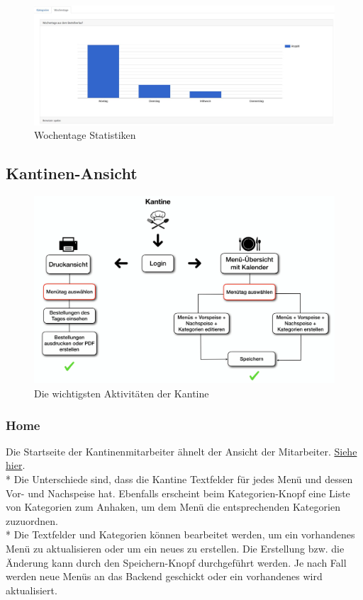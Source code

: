 \begin{figure}[htp]
    \centering
    \includegraphics[scale=0.3]{pics/statistiken_wochentage.JPG}
    \caption{Wochentage Statistiken}
    \label{fig:impl:WeekDaysCategories}
\end{figure}

\pagebreak

\subsection {Kantinen-Ansicht}
\begin{figure}[htp]
    \centering
    \includegraphics[scale=0.125]{pics/activity-kantine.png}
    \caption{Die wichtigsten Aktivitäten der Kantine}
    \author{Benjamin Besic}
    \label{fig:impl:ActCanteen}
\end{figure}
\subsubsection {Home}

Die Startseite der Kantinenmitarbeiter ähnelt der Ansicht der Mitarbeiter. \hyperref[sec:MitHome]{Siehe hier}. \\*
Die Unterschiede sind, dass die Kantine Textfelder für jedes Menü und dessen Vor- und Nachspeise hat.
Ebenfalls erscheint beim Kategorien-Knopf eine Liste von Kategorien zum Anhaken, um dem Menü die entsprechenden Kategorien zuzuordnen. \\*
Die Textfelder und Kategorien können bearbeitet werden, um ein vorhandenes Menü zu aktualisieren oder um ein neues zu erstellen.
Die Erstellung bzw. die Änderung kann durch den Speichern-Knopf durchgeführt werden. Je nach Fall werden neue Menüs an das Backend geschickt oder ein
vorhandenes wird aktualisiert.

